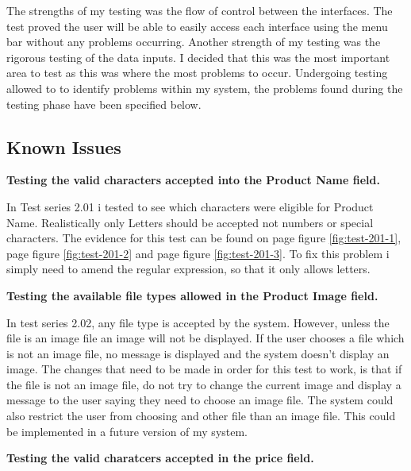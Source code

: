 The strengths of my testing was the flow of control between the interfaces. The test proved the user will be able to easily access each interface using the menu bar without any problems occurring. Another strength of my testing was the rigorous testing of the data inputs. I decided that this was the most important area to test as this was where the most problems to occur. Undergoing testing allowed to to identify problems within my system, the problems found during the testing phase have been specified below.

\subsection{Known Issues}

\textbf{Testing the valid characters accepted into the Product Name field.}

In Test series 2.01 i tested to see which characters were eligible for Product Name. Realistically only Letters should be accepted not numbers or special characters. The evidence for this test can be found on page \pageref{fig:test-201-1} figure \ref{fig:test-201-1}, page \pageref{fig:test-201-2} figure \ref{fig:test-201-2} and  page \pageref{fig:test-201-3} figure \ref{fig:test-201-3}. To fix this problem i simply need to amend the regular expression, so that it only allows letters. 



\textbf{Testing the available file types allowed in the Product Image field.}

In test series 2.02, any file type is accepted by the system. However, unless the file is an image file an image will not be displayed. If the user chooses a file which is not an image file, no message is displayed and the system doesn't display an image. The changes that need to be made in order for this test to work, is that if the file is not an image file, do not try to change the current image and display a message to the user saying they need to choose an image file. The system could also restrict the user from choosing and other file than an image file. This could be implemented in a future version of my system.

\textbf{Testing the valid charatcers accepted in the price field.}

